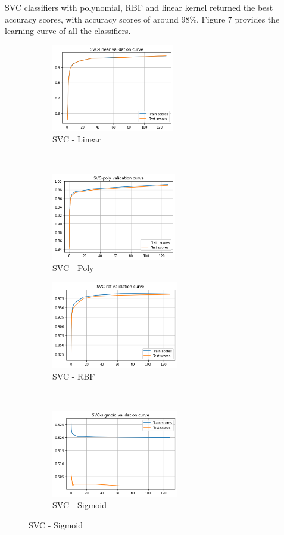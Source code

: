 \documentclass{article}
\begin{document}
SVC classifiers with polynomial, RBF and linear kernel returned the best accuracy scores, with accuracy scores of around 98\%. Figure 7 provides the learning curve of all the classifiers.

\begin{figure}[htb!]
    \centering
    \begin{subfigure}[t]{0.5\textwidth}
        \centering
        \includegraphics[height=1.5in]{img/momentum-classification/validation-curves/svc-linear}
        \caption{SVC - Linear}
    \end{subfigure}%
    ~ 
    \begin{subfigure}[t]{0.5\textwidth}
        \centering
        \includegraphics[height=1.5in]{img/momentum-classification/validation-curves/svc-poly}
        \caption{SVC - Poly}
    \end{subfigure}

    \centering
    \begin{subfigure}[t]{0.5\textwidth}
        \centering
        \includegraphics[height=1.5in]{img/momentum-classification/validation-curves/svc-rbf}
        \caption{SVC - RBF}
    \end{subfigure}%
    ~ 
    \begin{subfigure}[t]{0.5\textwidth}
        \centering
        \includegraphics[height=1.5in]{img/momentum-classification/validation-curves/svc-sigmoid}
        \caption{SVC - Sigmoid}
    \end{subfigure}


\end{figure}
\end{document}
